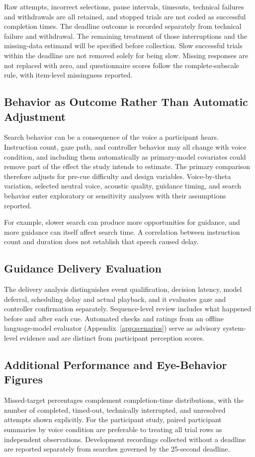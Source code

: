 Raw attempts, incorrect selections, pause intervals, timeouts, technical failures and withdrawals are all retained, and stopped trials are not coded as successful completion times. The deadline outcome is recorded separately from technical failure and withdrawal. The remaining treatment of those interruptions and the missing-data estimand will be specified before collection. Slow successful trials within the deadline are not removed solely for being slow. Missing responses are not replaced with zero, and questionnaire scores follow the complete-subscale rule, with item-level missingness reported.

\subsection{Behavior as Outcome Rather Than Automatic Adjustment}
Search behavior can be a consequence of the voice a participant hears. Instruction count, gaze path, and controller behavior may all change with voice condition, and including them automatically as primary-model covariates could remove part of the effect the study intends to estimate. The primary comparison therefore adjusts for pre-cue difficulty and design variables. Voice-by-theta variation, selected neutral voice, acoustic quality, guidance timing, and search behavior enter exploratory or sensitivity analyses with their assumptions reported.

For example, slower search can produce more opportunities for guidance, and more guidance can itself affect search time. A correlation between instruction count and duration does not establish that speech caused delay.

\subsection{Guidance Delivery Evaluation}
The delivery analysis distinguishes event qualification, decision latency, model deferral, scheduling delay and actual playback, and it evaluates gaze and controller confirmation separately. Sequence-level review includes what happened before and after each cue. Automated checks and ratings from an offline language-model evaluator (Appendix~\ref{app:scenarios}) serve as advisory system-level evidence and are distinct from participant perception scores.

\subsection{Additional Performance and Eye-Behavior Figures}
Missed-target percentages complement completion-time distributions, with the number of completed, timed-out, technically interrupted, and unresolved attempts shown explicitly. For the participant study, paired participant summaries by voice condition are preferable to treating all trial rows as independent observations. Development recordings collected without a deadline are reported separately from searches governed by the 25-second deadline.

